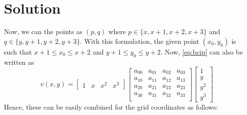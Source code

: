 \documentclass[a4paper, landscape]{article}
\begin{document}
\section{Solution}
Now, we can the points as $(p,q)$ where $p\in\{x,x+1,x+2,x+3\}$ and $q\in\{y,y+1,y+2,y+3\}$. With this formulation, the given point $(x_0,y_0)$ is such that $x+1\leq x_0\leq x+2$ and $y+1\leq y_0\leq y+2$. Now, \ref{eq:bcip} can also be written as
\begin{equation}
    v(x,y)=\begin{bmatrix}
        1 & x & x^2 & x^3
    \end{bmatrix}
    \begin{bmatrix}
        a_{00} & a_{01} & a_{02} & a_{03}\\
        a_{10} & a_{11} & a_{12} & a_{13}\\
        a_{20} & a_{21} & a_{22} & a_{23}\\
        a_{30} & a_{31} & a_{32} & a_{33}\\
    \end{bmatrix}
    \begin{bmatrix}
        1 \\ y \\y^2 \\ y^3
    \end{bmatrix}
\end{equation}
Hence, these can be easily combined for the grid coordinates as follows:
\end{document}
